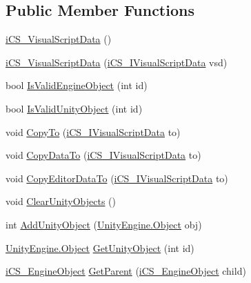 \subsection*{Public Member Functions}
\begin{DoxyCompactItemize}
\item 
\hyperlink{classi_c_s___visual_script_data_ae1aa3ccd84ac12f55b372b90daf65804}{i\+C\+S\+\_\+\+Visual\+Script\+Data} ()
\item 
\hyperlink{classi_c_s___visual_script_data_a601e32e099f8d583b46fe9a50cbfb258}{i\+C\+S\+\_\+\+Visual\+Script\+Data} (\hyperlink{interfacei_c_s___i_visual_script_data}{i\+C\+S\+\_\+\+I\+Visual\+Script\+Data} vsd)
\item 
bool \hyperlink{classi_c_s___visual_script_data_abd07d566dbda1ce8e978c9faf62b0274}{Is\+Valid\+Engine\+Object} (int id)
\item 
bool \hyperlink{classi_c_s___visual_script_data_a6c4c5cc6554e5b447e25159f5af8e7a9}{Is\+Valid\+Unity\+Object} (int id)
\item 
void \hyperlink{classi_c_s___visual_script_data_a6f2134483b40d91fa9a348c1e4f03ea4}{Copy\+To} (\hyperlink{interfacei_c_s___i_visual_script_data}{i\+C\+S\+\_\+\+I\+Visual\+Script\+Data} to)
\item 
void \hyperlink{classi_c_s___visual_script_data_a9c124dcf5f6497b2c6e8b880c399b3b2}{Copy\+Data\+To} (\hyperlink{interfacei_c_s___i_visual_script_data}{i\+C\+S\+\_\+\+I\+Visual\+Script\+Data} to)
\item 
void \hyperlink{classi_c_s___visual_script_data_a8cc9695206d11edb4b15988dccad9d50}{Copy\+Editor\+Data\+To} (\hyperlink{interfacei_c_s___i_visual_script_data}{i\+C\+S\+\_\+\+I\+Visual\+Script\+Data} to)
\item 
void \hyperlink{classi_c_s___visual_script_data_a98969f050c736feb45027967ee71e339}{Clear\+Unity\+Objects} ()
\item 
int \hyperlink{classi_c_s___visual_script_data_a9f5ee3940946444973a2b0d3a2129750}{Add\+Unity\+Object} (\hyperlink{i_c_s___logic_8cs_a5b2c8b05b9a357906d7f9e5b2c1e154d}{Unity\+Engine.\+Object} obj)
\item 
\hyperlink{i_c_s___logic_8cs_a5b2c8b05b9a357906d7f9e5b2c1e154d}{Unity\+Engine.\+Object} \hyperlink{classi_c_s___visual_script_data_ac2767e1ae24f1bb8655710e5c03bccf3}{Get\+Unity\+Object} (int id)
\item 
\hyperlink{classi_c_s___engine_object}{i\+C\+S\+\_\+\+Engine\+Object} \hyperlink{classi_c_s___visual_script_data_a58199f8ad13db4be6f180ba76b275726}{Get\+Parent} (\hyperlink{classi_c_s___engine_object}{i\+C\+S\+\_\+\+Engine\+Object} child)

\end{DoxyCompactItemize}
